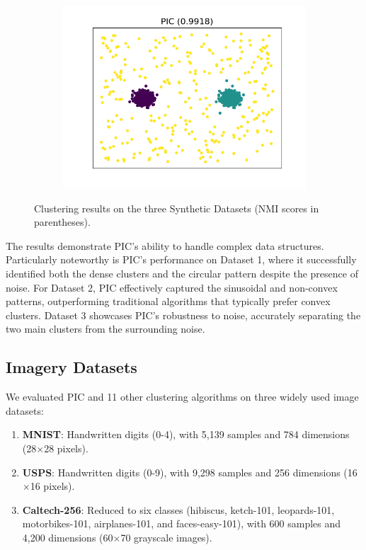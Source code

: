 \begin{figure}[htb]
\begin{subfigure}[b]{0.32\textwidth}
        \includegraphics[width=\textwidth]{../results/plots/dataset_2/PIC_clustering.png}
    \end{subfigure}

    \caption{Clustering results on the three Synthetic Datasets (NMI scores in parentheses).}
    \label{fig:synthetic}
\end{figure}

The results demonstrate PIC's ability to handle complex data structures. Particularly noteworthy is PIC's performance on Dataset 1, where it successfully identified both the dense clusters and the circular pattern despite the presence of noise. For Dataset 2, PIC effectively captured the sinusoidal and non-convex patterns, outperforming traditional algorithms that typically prefer convex clusters. Dataset 3 showcases PIC's robustness to noise, accurately separating the two main clusters from the surrounding noise.

\subsection{Imagery Datasets}
We evaluated PIC and 11 other clustering algorithms on three widely used image datasets:

\begin{enumerate}
    \item \textbf{MNIST}: Handwritten digits (0-4), with 5,139 samples and 784 dimensions (28$\times$28 pixels).
    \item \textbf{USPS}: Handwritten digits (0-9), with 9,298 samples and 256 dimensions (16$\times$16 pixels).
    \item \textbf{Caltech-256}: Reduced to six classes (hibiscus, ketch-101, leopards-101, motorbikes-101, airplanes-101, and faces-easy-101), with 600 samples and 4,200 dimensions (60$\times$70 grayscale images).
\end{enumerate}

